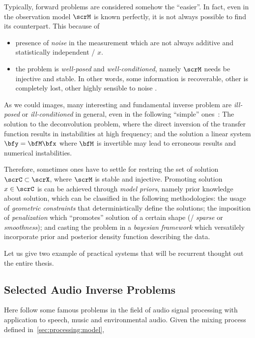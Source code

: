 Typically, forward problems are considered somehow the ``easier''.
In fact, even in the observation model $\scrM$ is known perfectly, it is not always possible to find its counterpart.
This because of
\begin{itemize}
    \item presence of \textit{noise} in the measurement which are not always additive and statistically independent \wrt/ $x$.
    \item the problem is \textit{well-posed} and \textit{well-conditioned}, namely $\scrM$ needs be injective and stable.
    In other words, some information is recoverable, other is completely lost, other highly sensible to noise
    .
\end{itemize}

As we could images, many interesting and fundamental inverse problem are
\textit{ill-posed} or \textit{ill-conditioned} in general, even in the following ``simple'' ones~\cite{kitic2015cosparse}:
The solution to the deconvolution problem, where the direct inversion of the transfer function results in instabilities
at high frequency; and the solution a linear system $\bfy = \bfM \bfx$ where $\bfM$ is invertible
may lead to erroneous results and numerical instabilities.

Therefore, sometimes ones have to settle for restring the set of solution $\scrC \subset \scrX$,
where $\scrM$ is stable and injective.
Promoting solution $x \in \scrC$ is can be achieved through \textit{model priors}, namely prior knowledge about solution, which can
be classified in the following methodologies:
the usage of \textit{geometric constraints} that deterministically define the solutions; the imposition of \textit{penalization}
which ``promotes'' solution of a certain shape (\eg/ \textit{sparse}
 or \textit{smoothness});
and casting the problem in a \textit{bayesian framework} which versatilely incorporate prior and posterior density function describing the data.

Let us give two example of practical systems that will be recurrent thought out the entire thesis.

\subsection{Selected Audio Inverse Problems}
Here follow some famous problems in the field of audio signal processing with application to speech, music and environmental audio.
Given the mixing process defined in~\cref{sec:processing:model},

